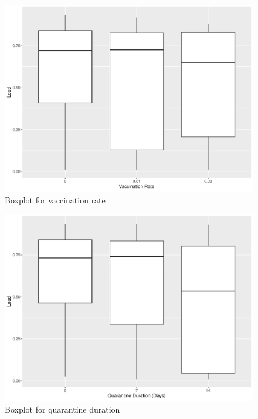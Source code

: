 \documentclass[12pt,a4paper]{article}
\begin{document}
\begin{appendices}
\begin{figure}[H]
	\includegraphics[width=\linewidth]{boxplot_vac.rate.pdf}	
	\caption{Boxplot for vaccination rate}
	\label{fig:boxplot_vac.rate}
\end{figure}

\begin{figure}[H]
	\includegraphics[width=\linewidth]{boxplot_quar.dur.pdf}	
	\caption{Boxplot for quarantine duration}
	\label{fig:boxplot_quar.dur}
\end{figure}


\end{appendices}
\end{document}
